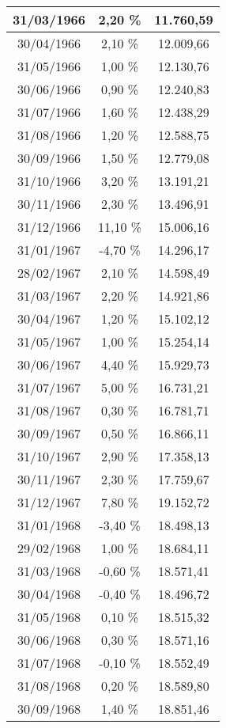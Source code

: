 \begin{center}
\begin{longtable}{|c|c|c|}
31/03/1966 & 2,20 \% & 11.760,59  \\ \hline
30/04/1966 & 2,10 \% & 12.009,66  \\ \hline
31/05/1966 & 1,00 \% & 12.130,76  \\ \hline
30/06/1966 & 0,90 \% & 12.240,83  \\ \hline
31/07/1966 & 1,60 \% & 12.438,29  \\ \hline
31/08/1966 & 1,20 \% & 12.588,75  \\ \hline
30/09/1966 & 1,50 \% & 12.779,08  \\ \hline
31/10/1966 & 3,20 \% & 13.191,21  \\ \hline
30/11/1966 & 2,30 \% & 13.496,91  \\ \hline
31/12/1966 & 11,10 \% & 15.006,16  \\ \hline
31/01/1967 & -4,70 \% & 14.296,17  \\ \hline
28/02/1967 & 2,10 \% & 14.598,49  \\ \hline
31/03/1967 & 2,20 \% & 14.921,86  \\ \hline
30/04/1967 & 1,20 \% & 15.102,12  \\ \hline
31/05/1967 & 1,00 \% & 15.254,14  \\ \hline
30/06/1967 & 4,40 \% & 15.929,73  \\ \hline
31/07/1967 & 5,00 \% & 16.731,21  \\ \hline
31/08/1967 & 0,30 \% & 16.781,71  \\ \hline
30/09/1967 & 0,50 \% & 16.866,11  \\ \hline
31/10/1967 & 2,90 \% & 17.358,13  \\ \hline
30/11/1967 & 2,30 \% & 17.759,67  \\ \hline
31/12/1967 & 7,80 \% & 19.152,72  \\ \hline
31/01/1968 & -3,40 \% & 18.498,13  \\ \hline
29/02/1968 & 1,00 \% & 18.684,11  \\ \hline
31/03/1968 & -0,60 \% & 18.571,41  \\ \hline
30/04/1968 & -0,40 \% & 18.496,72  \\ \hline
31/05/1968 & 0,10 \% & 18.515,32  \\ \hline
30/06/1968 & 0,30 \% & 18.571,16  \\ \hline
31/07/1968 & -0,10 \% & 18.552,49  \\ \hline
31/08/1968 & 0,20 \% & 18.589,80  \\ \hline
30/09/1968 & 1,40 \% & 18.851,46  \\ \hline

\end{longtable}
\end{center}
